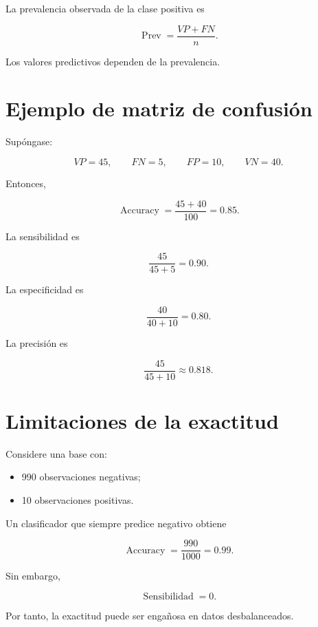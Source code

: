 \documentclass[
  spanish,
  10.5pt,
  letterpaper,
  DIV=11,
  numbers=noendperiod,
  oneside,
  open=any]{scrreprt}
\providecommand{\tightlist}{%
  \setlength{\itemsep}{0pt}\setlength{\parskip}{0pt}}
\theoremstyle{definition}
\theoremstyle{definition}
\theoremstyle{plain}
\theoremstyle{remark}
\begin{document}

La prevalencia observada de la clase positiva es

\[
\operatorname{Prev}
=
\frac{
VP+FN
}{
n
}.
\]

Los valores predictivos dependen de la prevalencia.

\section*{Ejemplo de matriz de
confusión}\label{ejemplo-de-matriz-de-confusiuxf3n}


Supóngase:

\[
VP=45,
\qquad
FN=5,
\qquad
FP=10,
\qquad
VN=40.
\]

Entonces,

\[
\operatorname{Accuracy}
=
\frac{45+40}{100}
=
0.85.
\]

La sensibilidad es

\[
\frac{45}{45+5}
=
0.90.
\]

La especificidad es

\[
\frac{40}{40+10}
=
0.80.
\]

La precisión es

\[
\frac{45}{45+10}
\approx 0.818.
\]

\section*{Limitaciones de la
exactitud}\label{limitaciones-de-la-exactitud}


Considere una base con:

\begin{itemize}
\tightlist
\item
  990 observaciones negativas;
\item
  10 observaciones positivas.
\end{itemize}

Un clasificador que siempre predice negativo obtiene

\[
\operatorname{Accuracy}
=
\frac{990}{1000}
=
0.99.
\]

Sin embargo,

\[
\operatorname{Sensibilidad}=0.
\]

Por tanto, la exactitud puede ser engañosa en datos desbalanceados.
\end{document}
